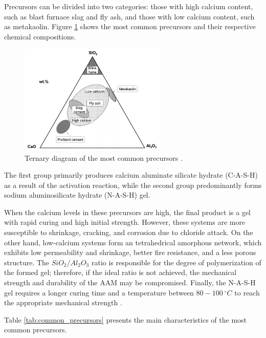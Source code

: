 Precursors can be divided into two categories: those with high calcium content, such as blast furnace slag and fly ash, and those with low calcium content, such as metakaolin.
Figure \ref{fig:ternary_diagram} shows the most common precursors and their respective chemical compositions.

\begin{figure}[ht]
  \centering
  \includegraphics[width=0.625\textwidth]{Cap2/images/ternary_diagram.png}
  \caption{Ternary diagram of the most common precursors \cite{giergiczny2019fly}.}
  \label{fig:ternary_diagram}
\end{figure}

The first group primarily produces calcium aluminate silicate hydrate (C-A-S-H) as a result of the activation reaction, while the second group predominantly forms sodium aluminosilicate hydrate (N-A-S-H) gel.

When the calcium levels in these precursors are high, the final product is a gel with rapid curing and high initial strength. However, these systems are more susceptible to shrinkage, cracking, and corrosion due to chloride attack.
On the other hand, low-calcium systems form an tetrahedrical amorphous network, which exhibits low permeability and shrinkage, better fire resistance, and a less porous structure.
The $SiO_2/Al_2O_3$ ratio is responsible for the degree of polymerization of the formed gel; therefore, if the ideal ratio is not achieved, the mechanical strength and durability of the AAM may be compromised.
Finally, the N-A-S-H gel requires a longer curing time and a temperature between $80-100\ ^\circ C$ to reach the appropriate mechanical strength \cite{Nodehi2021}.

Table \ref{tab:common_precursors} presents the main characteristics of the most common precursors.

